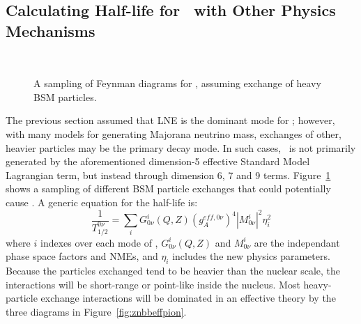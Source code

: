 \documentclass[/main.tex]{subfiles}
\begin{document}
\subsection{Calculating Half-life for \znbb\ with Other Physics Mechanisms}
\begin{figure}[t]
  \centering
  \\
  \caption[\znbb\ Diagrams from Heavy BSM Mechanisms]{\label{fig:znbbheavy}
    A sampling of Feynman diagrams for \znbb, assuming exchange of heavy BSM particles.
  }
\end{figure}
The previous section assumed that LNE is the dominant mode for \znbb; however, with many models for generating Majorana neutrino mass, exchanges of other, heavier particles may be the primary decay mode.
In such cases, \znbb\ is not primarily generated by the aforementioned dimension-5 effective Standard Model Lagrangian term, but instead through dimension 6, 7 and 9 terms\cite{Cirigliano2018}.
Figure~\ref{fig:znbbheavy} shows a sampling of different BSM particle exchanges that could potentially cause \znbb.
A generic equation for the half-life is:
\begin{equation}
  \frac{1}{T^{0\nu}_{1/2}}=\sum_iG^i_{0\nu}(Q,Z)(g_A^{eff,0\nu})^4|M^i_{0\nu}|^2\eta_i^2
\end{equation}
where $i$ indexes over each mode of \znbb, $G^i_{0\nu}(Q,Z)$ and $M^i_{0\nu}$ are the independant phase space factors and NMEs, and $\eta_i$ includes the new physics parameters.
Because the particles exchanged tend to be heavier than the nuclear scale, the interactions will be short-range or point-like inside the nucleus.
Most heavy-particle exchange interactions will be dominated in an effective theory by the three diagrams in Figure~\ref{fig:znbbeffpion}.
\end{document}
